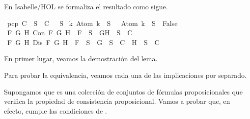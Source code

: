 \begin{isabellebody}
\begin{isamarkuptext}
  En Isabelle/HOL se formaliza el resultado como sigue.%
\end{isamarkuptext}\isamarkuptrue%
\isamarkupfalse%
\ {\isachardoublequoteopen}pcp\ C\ {\isacharequal}\ {\isacharparenleft}{\isasymforall}S\ {\isasymin}\ C{\isachardot}\ {\isasymbottom}\ {\isasymnotin}\ S\isanewline
{\isasymand}\ {\isacharparenleft}{\isasymforall}k{\isachardot}\ Atom\ k\ {\isasymin}\ S\ {\isasymlongrightarrow}\ \isactrlbold {\isasymnot}\ {\isacharparenleft}Atom\ k{\isacharparenright}\ {\isasymin}\ S\ {\isasymlongrightarrow}\ False{\isacharparenright}\isanewline
{\isasymand}\ {\isacharparenleft}{\isasymforall}F\ G\ H{\isachardot}\ Con\ F\ G\ H\ {\isasymlongrightarrow}\ F\ {\isasymin}\ S\ {\isasymlongrightarrow}\ {\isacharbraceleft}G{\isacharcomma}H{\isacharbraceright}\ {\isasymunion}\ S\ {\isasymin}\ C{\isacharparenright}\isanewline
{\isasymand}\ {\isacharparenleft}{\isasymforall}F\ G\ H{\isachardot}\ Dis\ F\ G\ H\ {\isasymlongrightarrow}\ F\ {\isasymin}\ S\ {\isasymlongrightarrow}\ {\isacharbraceleft}G{\isacharbraceright}\ {\isasymunion}\ S\ {\isasymin}\ C\ {\isasymor}\ {\isacharbraceleft}H{\isacharbraceright}\ {\isasymunion}\ S\ {\isasymin}\ C{\isacharparenright}{\isacharparenright}{\isachardoublequoteclose}\isanewline
%
\isadelimproof
\ \ %
\endisadelimproof
%
\isatagproof
{}\isamarkupfalse%
%
\endisatagproof
{\isafoldproof}%
%
\isadelimproof
%
\endisadelimproof
%
\begin{isamarkuptext}%
En primer lugar, veamos la demostración del lema.

\begin{demostracion}
  Para probar la equivalencia, veamos cada una de las implicaciones por separado.

\textbf{}
  
  Supongamos que  es una colección de conjuntos de fórmulas proposicionales que
  verifica la propiedad de consistencia proposicional. Vamos a probar que, en efecto,
  cumple las condiciones de . 


\end{demostracion}
\end{isamarkuptext}
\end{isabellebody}

